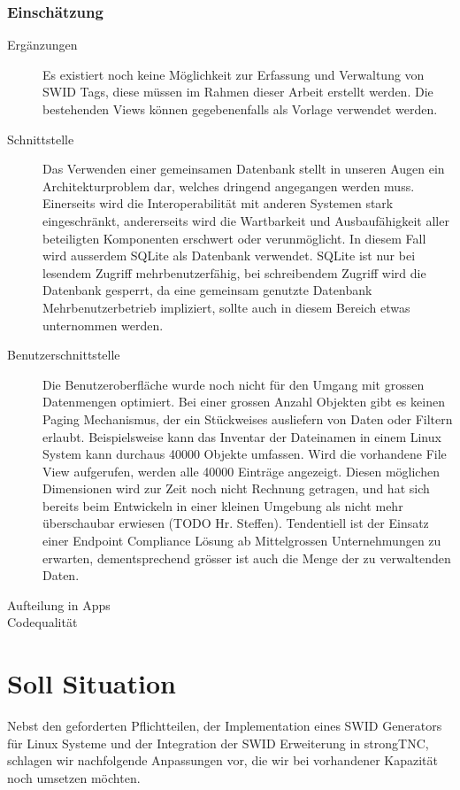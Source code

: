 \subsubsection{Einschätzung}
\begin{description}
	\item[Ergänzungen] Es existiert noch keine Möglichkeit zur Erfassung und
	Verwaltung von SWID Tags, diese müssen im Rahmen dieser Arbeit erstellt werden.
	Die bestehenden Views können gegebenenfalls als Vorlage verwendet werden.
	
	\item[Schnittstelle] Das Verwenden einer gemeinsamen Datenbank stellt in unseren
	Augen ein Architekturproblem dar, welches dringend angegangen werden muss.
	Einerseits wird die Interoperabilität mit anderen Systemen stark eingeschränkt,
	andererseits wird die Wartbarkeit und Ausbaufähigkeit aller beteiligten
	Komponenten erschwert oder verunmöglicht. In diesem Fall wird ausserdem SQLite
	als Datenbank verwendet. SQLite ist nur bei lesendem Zugriff mehrbenutzerfähig,
	bei schreibendem Zugriff wird die Datenbank gesperrt, da eine gemeinsam
	genutzte Datenbank Mehrbenutzerbetrieb impliziert, sollte auch in diesem Bereich
	etwas unternommen werden. 
	
	\item[Benutzerschnittstelle] 
	Die Benutzeroberfläche wurde noch nicht für den Umgang mit grossen Datenmengen
	optimiert. Bei einer grossen Anzahl Objekten gibt es keinen Paging Mechanismus,
	der ein Stückweises ausliefern von Daten oder Filtern erlaubt. Beispielsweise
	kann das Inventar der Dateinamen in einem Linux System kann durchaus 40000
	Objekte umfassen. Wird die vorhandene File View aufgerufen, werden alle 40000
	Einträge angezeigt. Diesen möglichen Dimensionen wird zur Zeit noch nicht
	Rechnung getragen, und hat sich bereits beim Entwickeln in einer kleinen
	Umgebung als nicht mehr überschaubar erwiesen (TODO Hr. Steffen). Tendentiell
	ist der Einsatz einer Endpoint Compliance Lösung ab Mittelgrossen
	Unternehmungen zu erwarten, dementsprechend grösser ist auch die Menge der
	zu verwaltenden Daten.

\item[Aufteilung in Apps] 
	
\item[Codequalität]
	
	
\end{description}

\section{Soll Situation}
Nebst den geforderten Pflichtteilen, der Implementation eines SWID Generators
für Linux Systeme und der Integration der SWID Erweiterung in strongTNC,
schlagen wir nachfolgende Anpassungen vor, die wir bei vorhandener Kapazität
noch umsetzen möchten.

